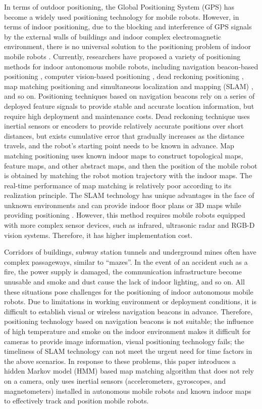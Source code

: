 \documentclass{llncs}
\begin{document}
In terms of outdoor positioning, the Global Positioning System (GPS) has become a widely used positioning technology for mobile robots. However, in terms of indoor positioning, due to the blocking and interference of GPS signals by the external walls of buildings and indoor complex electromagnetic environment, there is no universal solution to the positioning problem of indoor mobile robots \cite{Bachrach2011RANGE,bao2013indoor}. Currently, researchers have proposed a variety of positioning methods for indoor autonomous mobile robots, including navigation beacon-based positioning \cite{Tang2014multiary}, computer vision-based positioning \cite{lu2015visual,gao2017unsupervised}, dead reckoning positioning \cite{kim2015dead}, map matching positioning \cite{grisetti2007improved,cheng2015topological} and simultaneous localization and mapping (SLAM) \cite{de2014feature,havangi2014square}, and so on. Positioning techniques based on navigation beacons rely on a series of deployed feature signals to provide stable and accurate location information, but require high deployment and maintenance costs. Dead reckoning technique uses inertial sensors or encoders to provide relatively accurate positions over short distances, but exists cumulative error that gradually increases as the distance travels, and the robot's starting point needs to be known in advance. Map matching positioning uses known indoor maps to construct topological maps, feature maps, and other abstract maps, and then the position of the mobile robot is obtained by matching the robot motion trajectory with the indoor maps. The real-time performance of map matching is relatively poor according to its realization principle. The SLAM technology has unique advantages in the face of unknown environments and can provide indoor floor plans or 3D maps while providing positioning \cite{richter2018bayesian}. However, this method requires mobile robots equipped with more complex sensor devices, such as infrared, ultrasonic radar and RGB-D vision systems. Therefore, it has higher implementation cost.

Corridors of buildings, subway station tunnels and underground mines often have complex passageways, similar to “mazes”. In the event of an accident such as a fire, the power supply is damaged, the communication infrastructure become unusable and smoke and dust cause the lack of indoor lighting, and so on. All these situations pose challenges for the positioning of indoor autonomous mobile robots. Due to limitations in working environment or deployment conditions, it is difficult to establish visual or wireless navigation beacons in advance. Therefore, positioning technology based on navigation beacons is not suitable; the influence of high temperature and smoke on the indoor environment makes it difficult for cameras to provide image information, visual positioning technology fails; the timeliness of SLAM technology can not meet the urgent need for time factors in the above scenarios. In response to these problems, this paper introduces a hidden Markov model (HMM) based map matching algorithm that does not rely on a camera, only uses inertial sensors (accelerometers, gyroscopes, and magnetometers) installed in autonomous mobile robots and known indoor maps to effectively track and position mobile robots.
\end{document}
